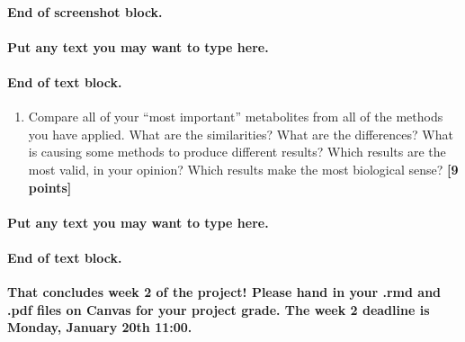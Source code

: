 \documentclass[
]{article}
\providecommand{\tightlist}{%
  \setlength{\itemsep}{0pt}\setlength{\parskip}{0pt}}
\begin{document}
\hypertarget{end-of-screenshot-block.-4}{%
\paragraph{\texorpdfstring{End of screenshot block.\\
}{End of screenshot block. }}\label{end-of-screenshot-block.-4}}

\hfill\break

\hypertarget{put-any-text-you-may-want-to-type-here.-36}{%
\paragraph{Put any text you may want to type
here.}\label{put-any-text-you-may-want-to-type-here.-36}}

\hypertarget{end-of-text-block.-38}{%
\paragraph{End of text block.}\label{end-of-text-block.-38}}

\begin{enumerate}
\def\labelenumi{\Alph{enumi})}
\setcounter{enumi}{5}
\tightlist
\item
  Compare all of your ``most important'' metabolites from all of the
  methods you have applied. What are the similarities? What are the
  differences? What is causing some methods to produce different
  results? Which results are the most valid, in your opinion? Which
  results make the most biological sense? \textbf{{[}9 points{]}}
\end{enumerate}

\hypertarget{put-any-text-you-may-want-to-type-here.-37}{%
\paragraph{Put any text you may want to type
here.}\label{put-any-text-you-may-want-to-type-here.-37}}

\hypertarget{end-of-text-block.-39}{%
\paragraph{End of text block.}\label{end-of-text-block.-39}}

\hfill\break
\hfill\break
\textbf{That concludes week 2 of the project! Please hand in your .rmd
and .pdf files on Canvas for your project grade. The week 2 deadline is
Monday, January 20th 11:00.}
\end{document}
